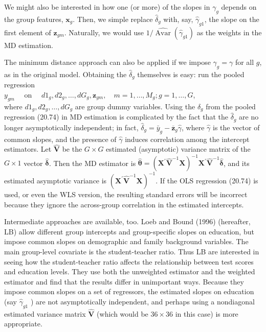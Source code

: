\documentclass[10pt]{article}
\begin{document}
We might also be interested in how one (or more) of the slopes in $\gamma_{g}$ depends on the group features, $\mathbf{x}_{g}$. Then, we simple replace $\hat{\delta}_{g}$ with, say, $\hat{\gamma}_{g 1}$, the slope on the first element of $\mathbf{z}_{g m}$. Naturally, we would use $1 / \widehat{\operatorname{Avar}}\left(\hat{\gamma}_{g 1}\right)$ as the weights in the MD estimation.

The minimum distance approach can also be applied if we impose $\gamma_{g}=\gamma$ for all $g$, as in the original model. Obtaining the $\hat{\delta}_{g}$ themselves is easy: run the pooled regression\\
$y_{g m} \quad$ on $\quad d 1_{g}, d 2_{g}, \ldots, d G_{g}, \mathbf{z}_{g m}, \quad m=1, \ldots, M_{g} ; g=1, \ldots, G$,\\
where $d 1_{g}, d 2_{g}, \ldots, d G_{g}$ are group dummy variables. Using the $\hat{\delta}_{g}$ from the pooled regression (20.74) in MD estimation is complicated by the fact that the $\hat{\delta}_{g}$ are no longer asymptotically independent; in fact, $\hat{\delta}_{g}=\bar{y}_{g}-\overline{\mathbf{z}}_{g} \hat{\gamma}$, where $\hat{\gamma}$ is the vector of common slopes, and the presence of $\hat{\gamma}$ induces correlation among the intercept estimators. Let $\hat{\mathbf{V}}$ be the $G \times G$ estimated (asymptotic) variance matrix of the $G \times 1$ vector $\hat{\boldsymbol{\delta}}$. Then the MD estimator is $\hat{\boldsymbol{\theta}}=\left(\mathbf{X}^{\prime} \hat{\mathbf{V}}^{-1} \mathbf{X}\right)^{-1} \mathbf{X}^{\prime} \hat{\mathbf{V}}^{-1} \hat{\boldsymbol{\delta}}$, and its estimated asymptotic variance is $\left(\mathbf{X}^{\prime} \hat{\mathbf{V}}^{-1} \mathbf{X}\right)^{-1}$. If the OLS regression (20.74) is used, or even the WLS version, the resulting standard errors will be incorrect because they ignore the across-group correlation in the estimated intercepts.

Intermediate approaches are available, too. Loeb and Bound (1996) (hereafter, LB) allow different group intercepts and group-specific slopes on education, but impose common slopes on demographic and family background variables. The main group-level covariate is the student-teacher ratio. Thus LB are interested in seeing how the student-teacher ratio affects the relationship between test scores and education levels. They use both the unweighted estimator and the weighted estimator and find that the results differ in unimportant ways. Because they impose common slopes on a set of regressors, the estimated slopes on education (say $\hat{\gamma}_{g 1}$ ) are not asymptotically independent, and perhaps using a nondiagonal estimated variance matrix $\hat{\mathbf{V}}$ (which would be $36 \times 36$ in this case) is more appropriate.
\end{document}
